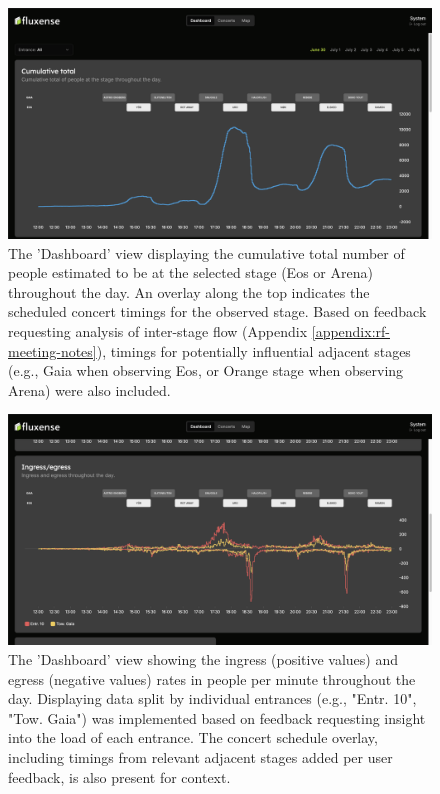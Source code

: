 \begin{figure}[ht]
  \centering
  \includegraphics[width=\textwidth]{Pictures/Misc/Frontend/cum_total.png}
  \caption{The 'Dashboard' view displaying the cumulative total number of people estimated to be at the selected stage (Eos or Arena) throughout the day. An overlay along the top indicates the scheduled concert timings for the observed stage. Based on feedback requesting analysis of inter-stage flow (Appendix \ref{appendix:rf-meeting-notes}), timings for potentially influential adjacent stages (e.g., Gaia when observing Eos, or Orange stage when observing Arena) were also included.}
\end{figure}


\begin{figure}[ht]
  \centering
  \includegraphics[width=\textwidth]{Pictures/Misc/Frontend/ingress_egress.png}
  \caption{The 'Dashboard' view showing the ingress (positive values) and egress (negative values) rates in people per minute throughout the day. Displaying data split by individual entrances (e.g., "Entr. 10", "Tow. Gaia") was implemented based on feedback requesting insight into the load of each entrance. The concert schedule overlay, including timings from relevant adjacent stages added per user feedback, is also present for context.}
\end{figure}


